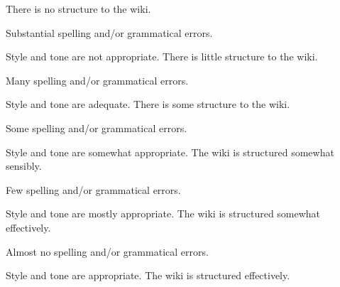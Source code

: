 \documentclass{../../fal_assignment}
\begin{document}
%

\rubricyeartwo
\begin{markingrubric}
%
%
        \grade\fail There is no structure to the wiki.
       		\par 	Substantial spelling and/or grammatical errors.
       		\par	Style and tone are not appropriate.
        \grade		There is little structure to the wiki.
       		\par 	Many spelling and/or grammatical errors.
       		\par	Style and tone are adequate.
        \grade 		There is some structure to the wiki.
       		\par 	Some spelling and/or grammatical errors.  
       		\par	Style and tone are somewhat appropriate.
        \grade 		The wiki is structured somewhat sensibly.
       		\par 	Few spelling and/or grammatical errors.
       		\par	Style and tone are mostly appropriate.
        \grade 		The wiki is structured somewhat effectively.
       		\par 	Almost no spelling and/or grammatical errors.
       		\par	Style and tone are appropriate.
        \grade 		The wiki is structured effectively.

\end{markingrubric}
\end{document}
